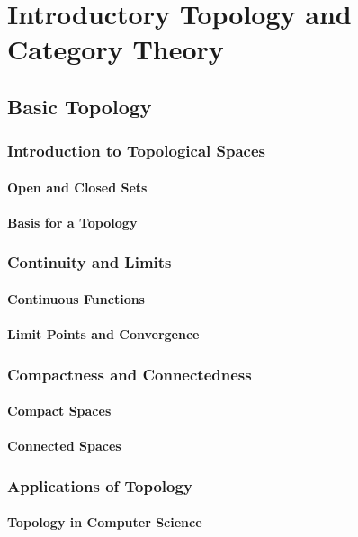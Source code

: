 \chapterspaceabove{6.75cm} 
\chapterspacebelow{7.25cm} 
\chapter{Introductory Topology and Category Theory}
\lipsum


\section{Basic Topology}
\lipsum
\subsection{Introduction to Topological Spaces}
\subsubsection{Open and Closed Sets}
\subsubsection{Basis for a Topology}
\subsection{Continuity and Limits}
\subsubsection{Continuous Functions}
\subsubsection{Limit Points and Convergence}
\subsection{Compactness and Connectedness}
\subsubsection{Compact Spaces}
\subsubsection{Connected Spaces}
\subsection{Applications of Topology}
\subsubsection{Topology in Computer Science}
